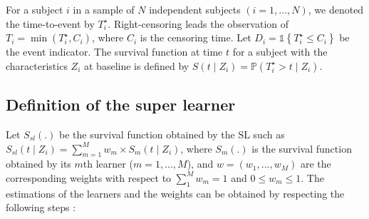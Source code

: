 For a subject \(i\) in a sample of \(N\) independent subjects \((i=1,...,N)\), we denoted the time-to-event by \(T_i^\star\). Right-censoring leads the observation of \(T_i=\min(T_i^\star, C_i)\), where \(C_i\) is the censoring time. Let \(D_i= \mathbb{1}\left \lbrace T_i^\star \leq C_i \right \rbrace\) be the event indicator. The survival function at time \(t\) for a subject with the characteristics \(Z_i\) at baseline is defined by \(S(t \mid Z_i ) = \mathbb{P}(T_i^\star> t \mid Z_i)\).

\hypertarget{definition-of-the-super-learner}{%
\subsection{Definition of the super learner}\label{definition-of-the-super-learner}}

Let \(S_{sl}(.)\) be the survival function obtained by the SL such as \(S_{sl}(t \mid Z_i)=\sum_{m=1}^M w_m \times S_m(t \mid Z_i)\), where \(S_m(.)\) is the survival function obtained by its \(m\)th learner (\(m = 1,...,M\)), and \(w = (w_1,...,w_M)\) are the corresponding weights with respect to \(\sum_1^M w_m=1\) and \(0 \leq w_m \leq 1\). The estimations of the learners and the weights can be obtained by respecting the following steps \citep{Polley2010}:

